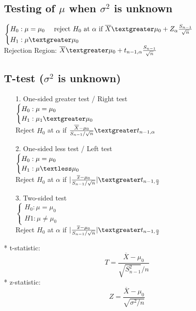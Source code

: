 \documentclass{article}
\begin{document}
\subsection{Testing of $\mu$ when $\sigma^2$ is unknown}
$\begin{cases}
    H_0:\mu =\mu_0 \quad \text{ reject } H_0 \text{ at } \alpha \text{ if } \overline{X} \textgreater \mu_0 + Z_{\alpha} \frac{S_{n-1}}{\sqrt{n}}\\
    H_1:\mu \textgreater \mu_0
\end{cases}$\\
Rejection Region: $\overline{X} \textgreater \mu_0 + t_{n-1,\alpha} \frac{S_{n-1}}{\sqrt{n}}$
\subsection{T-test ($\sigma^2$ is unknown)}
\begin{itemize}
    \item [1.] One-sided greater test / Right test \\
    $\begin{cases}
        H_0: \mu=\mu_0\\
        H_1: \mu_1 \textgreater \mu_0
    \end{cases}$\\
    Reject $H_0$ at $\alpha$ if $\frac{\overline{X}-\mu_0}{S_{n-1}/\sqrt{n}} \textgreater t_{n-1,\alpha}$
    \item[2.] One-sided less test / Left test\\
    $\begin{cases}
        H_0:\mu =\mu_0\\
        H_1:\mu \textless \mu_0
    \end{cases}$\\
    Reject $H_0$ at $\alpha$ if $|\frac{\overline{x}-\mu_0}{S_{n-1}/\sqrt{n}}| \textgreater t_{n-1, \frac{\alpha}{2}}$
    \item[3.] Two-sided test\\
    $\begin{cases}
        H_0:\mu=\mu_0\\
        H1:\mu \neq \mu_0
    \end{cases}$\\
    Reject $H_0$ at $\alpha$ if $|\frac{\overline{x}-\mu_0}{S_{n-1}/\sqrt{n}}| \textgreater t_{n-1, \frac{\alpha}{2}}$
\end{itemize}
* t-statistic: \[T=\frac{\overline{X}-\mu_0}{\sqrt{S_{n-1}^2}/n}\]
* z-statistic: \[Z=\frac{\overline{X}-\mu_0}{\sqrt{\sigma^2/n}}\]
\end{document}
